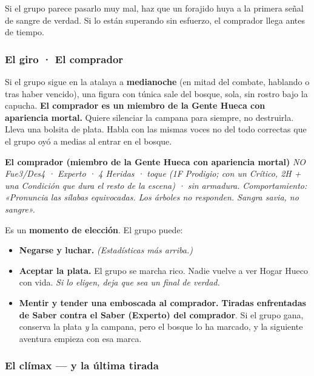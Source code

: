 \documentclass[10pt,a4paper]{article}
\newcommand{\tightlist}{\setlength{\itemsep}{0pt}\setlength{\parskip}{0pt}}
\begin{document}
Si el grupo parece pasarlo muy mal, haz que un forajido huya a la primera señal de sangre de verdad. Si lo están superando sin esfuerzo, el comprador llega antes de tiempo.

\subsubsection{El giro · El comprador}\label{el-giro-el-comprador}

Si el grupo sigue en la atalaya a \textbf{medianoche} (en mitad del combate, hablando o tras haber vencido), una figura con túnica sale del bosque, sola, sin rostro bajo la capucha. \textbf{El comprador es un miembro de la Gente Hueca con apariencia mortal.} Quiere silenciar la campana para siempre, no destruirla. Lleva una bolsita de plata. Habla con las mismas voces no del todo correctas que el grupo oyó a medias al entrar en el bosque.

\par\smallskip\begin{rpgnote}[fontupper=\normalfont]\textbf{El comprador (miembro de la Gente Hueca con apariencia mortal)} \emph{NO Fue3/Des4 · Experto · 4 Heridas · toque (1F Prodigio; con un Crítico, 2H + una Condición que dura el resto de la escena) · sin armadura.} \emph{Comportamiento: «Pronuncia las sílabas equivocadas. Los árboles no responden. Sangra savia, no sangre».}\end{rpgnote}\par\smallskip
Es un \textbf{momento de elección}. El grupo puede:

\begin{itemize}
\tightlist
\item
  \textbf{Negarse y luchar.} \emph{(Estadísticas más arriba.)}
\item
  \textbf{Aceptar la plata.} El grupo se marcha rico. Nadie vuelve a ver Hogar Hueco con vida. \emph{Si lo eligen, deja que sea un final de verdad.}
\item
  \textbf{Mentir y tender una emboscada al comprador.} \textbf{Tiradas enfrentadas de Saber contra el Saber (Experto) del comprador}. Si el grupo gana, conserva la plata \emph{y} la campana, pero el bosque lo ha marcado, y la siguiente aventura empieza con esa marca.
\end{itemize}

\subsubsection{El clímax --- y la última tirada}\label{el-cluxedmax-la-uxfaltima-tirada}
\end{document}
